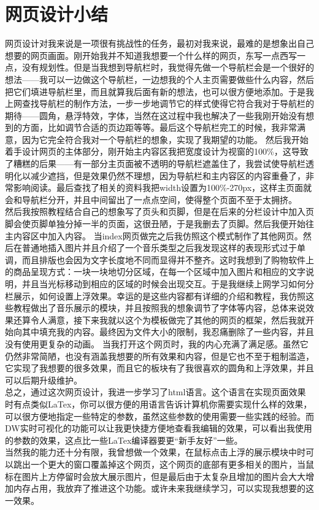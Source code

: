 \documentclass[supercite]{Experimental_Report}
\theoremstyle{definition}
\begin{document}
\newpage

\section{网页设计小结}
网页设计对我来说是一项很有挑战性的任务，最初对我来说，最难的是想象出自己想要的网页画面。刚开始我并不知道我想要一个什么样的网页，东写一点西写一点，没有规划性。但是当我想到导航栏时，我觉得先做一个导航栏会是一个很好的想法——我可以一边做这个导航栏，一边想我的个人主页需要做些什么内容，然后把它们填进导航栏里，而且就算我后面有新的想法，也可以很方便地添加。于是我上网查找导航栏的制作方法，一步一步地调节它的样式使得它符合我对于导航栏的期待——圆角，悬浮特效，字体，当然在这过程中我也解决了一些我刚开始没有想到的方面，比如调节合适的页边距等等。最后这个导航栏完工的时候，我非常满意，因为它完全符合我对一个导航栏的想象，实现了我期望的功能。
然后我开始着手设计网页的主体部分，刚开始主内容区我把宽度设计为视窗的100\%，这导致了糟糕的后果——有一部分主页面被不透明的导航栏遮盖住了，我尝试使导航栏透明化以减少遮挡，但是效果仍然不理想，因为导航栏和主内容区的内容重叠了，非常影响阅读。最后查找了相关的资料我把width设置为100\%-270px，这样主页面就会和导航栏分开，并且中间留出了一点点空间，使得整个页面不至于太拥挤。\\然后我按照教程结合自己的想象写了页头和页脚，但是在后来的分栏设计中加入页脚会使页脚单独分掉一半的页面，这很丑陋，于是我删去了页脚。然后我便开始往主内容区中加入内容。
当index网页做完之后我仿照这个模式制作了其他网页。然后在普通地插入图片并且介绍了一个音乐类型之后我发现这样的表现形式过于单调，而且排版也会因为文字长度地不同而显得并不整齐。这时我想到了购物软件上的商品呈现方式：一块一块地切分区域，在每一个区域中加入图片和相应的文字说明，并且当光标移动到相应的区域的时候会出现交互。于是我继续上网学习如何分栏展示，如何设置上浮效果。幸运的是这些内容都有详细的介绍和教程，我仿照这些教程做出了音乐展示的模块，并且按照我的想象调节了字体等内容，总体来说效果还算令人满意，接下来我就以这个为模板做完了其他的网页的框架，然后我就开始向其中填充我的内容。最终因为文件大小的限制，我忍痛删除了一些内容，并且没有使用更复杂的动画。
当我打开这个网页时，我的内心充满了满足感。虽然它仍然非常简陋，也没有涵盖我想要的所有效果和内容，但是它也不至于粗制滥造，它实现了我想要的很多效果，而且它的板块有了我很喜欢的圆角和上浮效果，并且可以后期升级维护。\\总之，通过这次网页设计，我进一步学习了html语言。这个语言在实现页面效果时有点类似LaTex，你可以很方便的用语言告诉计算机你需要实现什么样的效果，可以很方便地指定一些特定的参数，虽然这些参数的使用需要一些实践的经验。而DW实时可视化的功能可以让我更快捷方便地查看我编辑的效果，可以看出我使用的参数的效果，这点比一些LaTex编译器要更“新手友好”一些。\\当然我的能力还十分有限，我曾想做一个效果，在鼠标点击上浮的展示模块中时可以跳出一个更大的窗口覆盖掉这个网页，这个网页的底部有更多相关的图片，当鼠标在图片上方停留时会放大展示图片，但是最后由于太复杂且增加的图片会大大增加内存占用，我放弃了推进这个功能。或许未来我继续学习，可以实现我想要的这一效果。
\newpage
\end{document}
